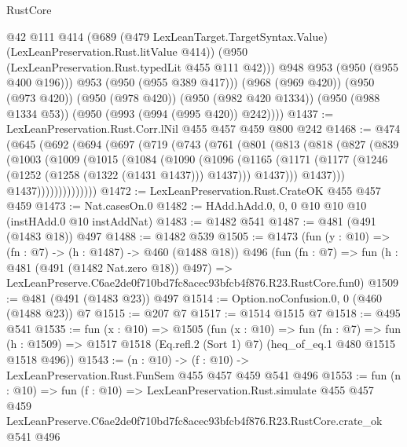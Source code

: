 \begin{lexlean}{RustCore}
\begin{coremodule}
              @42
              @111
              @414
              (@689
                (@479 LexLeanTarget.TargetSyntax.Value)
                (LexLeanPreservation.Rust.litValue @414))
              (@950 (LexLeanPreservation.Rust.typedLit @455 @111 @42)))
            @948
            @953
            (@950 (@955 @400 @196)))
          @953
          (@950 (@955 @389 @417)))
        (@968 (@969 @420))
        (@950 (@973 @420))
        (@950 (@978 @420))
        (@950 (@982 @420 @1334))
        (@950 (@988 @1334 @53))
        (@950 (@993 (@994 (@995 @420)) @242))))
@1437 := LexLeanPreservation.Rust.Corr.lNil @455 @457 @459 @800 @242
@1468 := @474
    (@645
      (@692
        (@694
          (@697
            (@719
              (@743
                (@761
                  (@801
                    (@813
                      (@818
                        (@827
                          (@839
                            (@1003
                              (@1009
                                (@1015
                                  (@1084
                                    (@1090
                                      (@1096
                                        (@1165
                                          (@1171
                                            (@1177
                                              (@1246 (@1252 (@1258 (@1322 (@1431 @1437))) @1437)))
                                            @1437)))
                                      @1437)))
                                @1437))))))))))))))
@1472 := LexLeanPreservation.Rust.CrateOK @455 @457 @459
@1473 := Nat.casesOn.{0}
@1482 := HAdd.hAdd.{0, 0, 0} @10 @10 @10 (instHAdd.{0} @10 instAddNat)
@1483 := @1482 @541
@1487 := @481 (@491 (@1483 @18)) @497
@1488 := @1482 @539
@1505 := @1473
    (fun (y : @10) => (fn : @7) -> (h : @1487) -> @460 (@1488 @18))
    @496
    (fun (fn : @7) =>
    fun (h : @481 (@491 (@1482 Nat.zero @18)) @497) =>
    LexLeanPreserve.C6ae2de0f710bd7fc8acec93bfcb4f876.R23.RustCore.fun0)
@1509 := @481 (@491 (@1483 @23)) @497
@1514 := Option.noConfusion.{0, 0} (@460 (@1488 @23)) @7
@1515 := @207 @7
@1517 := @1514 @1515 @7
@1518 := @495 @541
@1535 := fun (x : @10) =>
  @1505
    (fun (x : @10) =>
    fun (fn : @7) =>
    fun (h : @1509) => @1517 @1518 (Eq.refl.{2} (Sort 1) @7) (heq_of_eq.{1} @480 @1515 @1518 @496))
@1543 := (n : @10) -> (f : @10) -> LexLeanPreservation.Rust.FunSem @455 @457 @459 @541 @496
@1553 := fun (n : @10) =>
  fun (f : @10) =>
  LexLeanPreservation.Rust.simulate
    @455
    @457
    @459
    LexLeanPreserve.C6ae2de0f710bd7fc8acec93bfcb4f876.R23.RustCore.crate_ok
    @541
    @496
\end{coremodule}
\end{lexlean}
